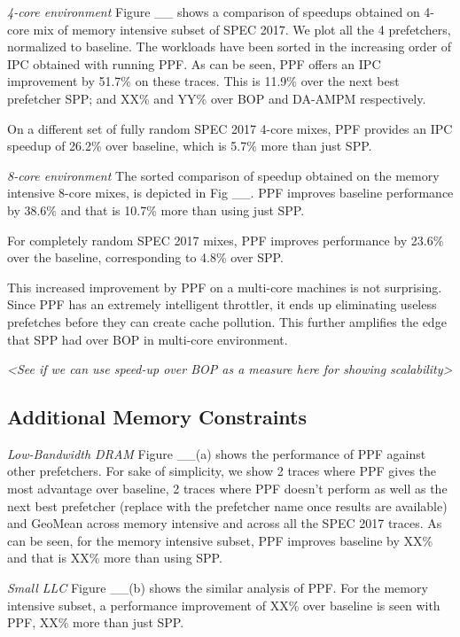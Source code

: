 \textit{4-core environment} Figure \_\_ shows a comparison of speedups
obtained on 4-core mix of memory intensive subset of SPEC 2017.  We
plot all the 4 prefetchers, normalized to baseline.  The workloads
have been sorted in the increasing order of IPC obtained with running PPF.
As can be seen,
PPF offers an IPC improvement by 51.7\% on these traces.  This is
11.9\% over the next best prefetcher SPP; and XX\% and YY\% over BOP
and DA-AMPM respectively.

On a different set of fully random SPEC 2017 4-core mixes, PPF provides an IPC speedup of 
26.2\% over baseline, which is 5.7\% more than just SPP.

\textit{8-core environment} The sorted comparison of speedup obtained 
on the memory intensive 8-core mixes, is depicted in Fig \_\_.
PPF improves baseline performance by 38.6\% and that is 10.7\% 
more than using just SPP.

For completely random SPEC 2017 mixes, PPF improves performance by 
23.6\% over the baseline, corresponding to 4.8\% over SPP.

This increased improvement by PPF on a multi-core machines is not
surprising.  Since PPF has an extremely intelligent throttler, it ends up 
eliminating useless prefetches before they can create cache
pollution. This further amplifies the edge that SPP had over BOP in multi-core environment.
 
\textit{<See if we can use
speed-up over BOP as a measure here for showing scalability>}

\subsection{Additional Memory Constraints}
\label{Results-AdditionalMem}

\textit{Low-Bandwidth DRAM}
Figure \_\_(a) shows the performance of PPF against other prefetchers. 
For sake of simplicity, we show 2 traces where PPF gives the most advantage
over baseline, 2 traces where PPF doesn't perform as well as the next
best prefetcher (replace with the prefetcher name once results are
available) and GeoMean across memory intensive and across all the 
SPEC 2017 traces. As can be seen, for the memory intensive subset,
 PPF improves baseline by XX\% and that is XX\% more than using SPP.

\textit{Small LLC}
Figure \_\_(b) shows the similar analysis of PPF.
For the memory intensive subset, a performance improvement of XX\% 
over baseline is seen with PPF, XX\% more than just SPP.


